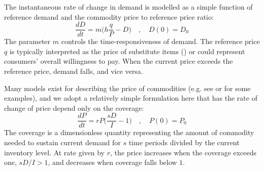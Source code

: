 \documentclass[12pt]{article}
\begin{document}
The instantaneous rate of change in demand is modelled as a simple function of reference demand and the commodity price to reference price ratio:
%
\begin{equation}
  \frac{dD}{dt} = m \Big( h \frac{q}{P} - D\Big) \quad, \quad D(0) = D_0
  \label{eq_demand}
\end{equation}
%
The parameter $m$ controls the time-responsiveness of demand. The reference price $q$ is typically interpreted as the price of substitute items (\cite{sterman2000}) or could represent consumers' overall willingness to pay. When the current price exceeds the reference price, demand falls, and vice versa.

Many models exist for describing the price of commodities (e.g. see \cite{legrand2019} or \cite{deGoede2013} for some examples), and we adopt a relatively simple formulation here that has the rate of change of price depend only on the coverage:
%
\begin{equation}
  \frac{dP}{dt} = r P \Big(\frac{sD}{I} - 1\Big) \quad, \quad P(0) = P_0
  \label{eq_price}
\end{equation}
%
The coverage is a dimensionless quantity representing the amount of commodity needed to sustain current demand for $s$ time periods divided by the current inventory level. At rate given by $r$, the price increases when the coverage exceeds one, $sD/I > 1$, and decreases when coverage falls below $1$.
\end{document}
